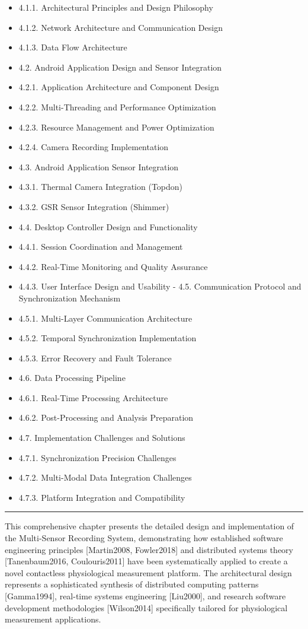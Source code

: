 \documentclass[12pt,a4paper]{article}
\begin{document}
\begin{itemize}
\item 4.1.1. Architectural Principles and Design Philosophy
\item 4.1.2. Network Architecture and Communication Design
\item 4.1.3. Data Flow Architecture
\item 4.2. Android Application Design and Sensor Integration
\item 4.2.1. Application Architecture and Component Design
\item 4.2.2. Multi-Threading and Performance Optimization
\item 4.2.3. Resource Management and Power Optimization
\item 4.2.4. Camera Recording Implementation
\item 4.3. Android Application Sensor Integration
\item 4.3.1. Thermal Camera Integration (Topdon)
\item 4.3.2. GSR Sensor Integration (Shimmer)
\item 4.4. Desktop Controller Design and Functionality
\item 4.4.1. Session Coordination and Management
\item 4.4.2. Real-Time Monitoring and Quality Assurance
\item 4.4.3. User Interface Design and Usability
    -
    4.5. Communication Protocol and Synchronization Mechanism
\item 4.5.1. Multi-Layer Communication Architecture
\item 4.5.2. Temporal Synchronization Implementation
\item 4.5.3. Error Recovery and Fault Tolerance
\item 4.6. Data Processing Pipeline
\item 4.6.1. Real-Time Processing Architecture
\item 4.6.2. Post-Processing and Analysis Preparation
\item 4.7. Implementation Challenges and Solutions
\item 4.7.1. Synchronization Precision Challenges
\item 4.7.2. Multi-Modal Data Integration Challenges
\item 4.7.3. Platform Integration and Compatibility

\end{itemize}
\hrule

This comprehensive chapter presents the detailed design and implementation of the Multi-Sensor Recording System,
demonstrating how established software engineering principles [Martin2008, Fowler2018] and distributed systems
theory [Tanenbaum2016, Coulouris2011] have been systematically applied to create a novel contactless physiological
measurement platform. The architectural design represents a sophisticated synthesis of distributed computing
patterns [Gamma1994], real-time systems engineering [Liu2000], and research software development
methodologies [Wilson2014] specifically tailored for physiological measurement applications.
\end{document}
